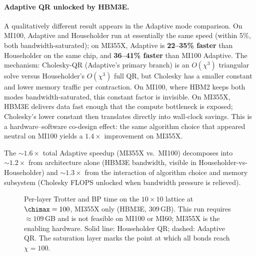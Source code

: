 \paragraph{Adaptive QR unlocked by HBM3E.}
A qualitatively different result appears in the Adaptive mode comparison.
On MI100, Adaptive and Householder run at essentially the same speed (within 5\%,
both bandwidth-saturated); on MI355X, Adaptive is \textbf{22--35\% faster} than
Householder on the same chip, and \textbf{36--41\% faster} than MI100 Adaptive.
The mechanism: Cholesky-QR (Adaptive's primary branch) is an $O(\chi^3)$
triangular solve versus Householder's $O(\chi^3)$ full QR, but Cholesky has a
smaller constant and lower memory traffic per contraction.
On MI100, where HBM2 keeps both modes bandwidth-saturated, this constant factor
is invisible.
On MI355X, HBM3E delivers data fast enough that the compute bottleneck is exposed;
Cholesky's lower constant then translates directly into wall-clock savings.
This is a hardware--software co-design effect: the same algorithm choice that
appeared neutral on MI100 yields a $\mathbf{1.4\times}$ improvement on MI355X.

The $\sim 1.6\times$ total Adaptive speedup (MI355X vs.\ MI100) decomposes into
${\sim}1.2\times$ from architecture alone (HBM3E bandwidth, visible in
Householder-vs-Householder) and ${\sim}1.3\times$ from the interaction of
algorithm choice and memory subsystem (Cholesky FLOPS unlocked when bandwidth
pressure is relieved).

\begin{figure}[ht]
\centering
\caption{Per-layer Trotter and BP time on the $10\times10$ lattice at
  $\chimax=100$, MI355X only (HBM3E, 309\,GB).
  This run requires $\approx 109$\,GB and is not feasible on MI100 or MI60;
  MI355X is the enabling hardware.
  Solid line: Householder QR; dashed: Adaptive QR.
  The saturation layer marks the point at which all bonds reach $\chi=100$.}
\label{fig:mi355x_10x10_chi100}
\end{figure}

